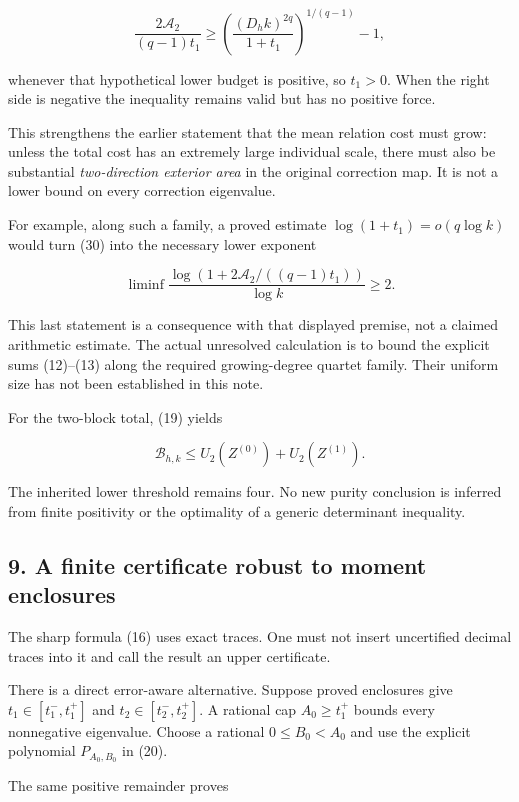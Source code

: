 \documentclass[
  11pt,
]{article}
\begin{document}
\[
 \boxed{
 \frac{2\mathcal A_2}{(q-1)t_1}
 \ge\left(\frac{(D_hk)^{2q}}{1+t_1}\right)^{1/(q-1)}-1,
 }                                                             \tag{30}
\]

whenever that hypothetical lower budget is positive, so \(t_1>0\). When
the right side is negative the inequality remains valid but has no
positive force.

This strengthens the earlier statement that the mean relation cost must
grow: unless the total cost has an extremely large individual scale,
there must also be substantial \emph{two-direction exterior area} in the
original correction map. It is not a lower bound on every correction
eigenvalue.

For example, along such a family, a proved estimate
\(\log(1+t_1)=o(q\log k)\) would turn (30) into the necessary lower
exponent

\[
 \liminf\frac{\log(1+2\mathcal A_2/((q-1)t_1))}{\log k}\ge2.
\]

This last statement is a consequence with that displayed premise, not a
claimed arithmetic estimate. The actual unresolved calculation is to
bound the explicit sums (12)--(13) along the required growing-degree
quartet family. Their uniform size has not been established in this
note.

For the two-block total, (19) yields

\[
 \mathcal B_{h,k}\le U_2(Z^{(0)})+U_2(Z^{(1)}).
\]

The inherited lower threshold remains four. No new purity conclusion is
inferred from finite positivity or the optimality of a generic
determinant inequality.

\subsection{9. A finite certificate robust to moment
enclosures}\label{a-finite-certificate-robust-to-moment-enclosures}

The sharp formula (16) uses exact traces. One must not insert
uncertified decimal traces into it and call the result an upper
certificate.

There is a direct error-aware alternative. Suppose proved enclosures
give \(t_1\in[t_1^-,t_1^+]\) and \(t_2\in[t_2^-,t_2^+]\). A rational cap
\(A_0\ge t_1^+\) bounds every nonnegative eigenvalue. Choose a rational
\(0\le B_0<A_0\) and use the explicit polynomial \(P_{A_0,B_0}\) in
(20).

The same positive remainder proves
\end{document}
